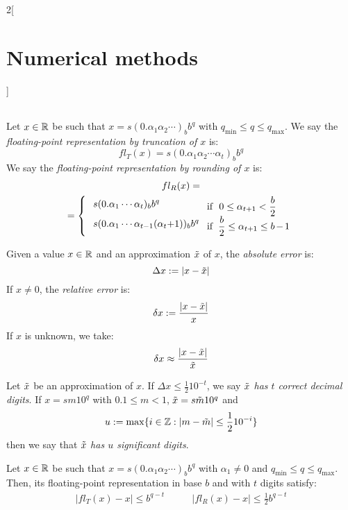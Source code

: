 \documentclass[../../../main.tex]{subfiles}
\begin{document}
\begin{multicols}{2}[\section{Numerical methods}]
\begin{center}
\begin{minipage}{\linewidth}
\begin{tabular}{c|ccccc}
      \end{tabular}
    \end{minipage}
  \end{center}
  \begin{definition}
    Let $x\in\mathbb{R}$ be such that $x=s(0.\alpha_1\alpha_2\cdots)_bb^q$ with $q_\text{min}\leq q\leq q_\text{max}$. We say the \textit{floating-point representation by truncation of $x$} is: $$fl_T(x)=s(0.\alpha_1\alpha_2\cdots\alpha_t)_bb^q$$ We say the \textit{floating-point representation by rounding of $x$} is:
    \begin{multline*}
      fl_R(x)=\\=\left\{\text{\setlength{\tabcolsep}{4pt}
        \begin{tabular}{m{3.85cm}m{3cm}}
          $s(0.\alpha_1\cdots\alpha_t)_bb^q$                 & if $\ 0\leq\alpha_{t+1}<\frac{b}{2}$       \\
          $s(0.\alpha_1\cdots\alpha_{t-1}(\alpha_t+1))_bb^q$ & if $\ \frac{b}{2}\leq\alpha_{t+1}\leq b-1$
        \end{tabular}}\right.
    \end{multline*}
  \end{definition}
  \begin{definition}
    Given a value $x\in\mathbb{R}$ and an approximation $\Tilde{x}$ of $x$, the \textit{absolute error} is: $$\Delta x:=|x-\Tilde{x}|$$ If $x\ne 0$, the \textit{relative error} is: $$\delta x:=\frac{|x-\Tilde{x}|}{x}$$ If $x$ is unknown, we take: $$\delta x\approx\frac{|x-\Tilde{x}|}{\Tilde{x}}$$
  \end{definition}
  \begin{definition}
    Let $\Tilde{x}$ be an approximation of $x$. If $\Delta x\leq\frac{1}{2}10^{-t}$, we say \textit{$\Tilde{x}$ has $t$ correct decimal digits}. If $x=sm10^q$ with $0.1\leq m<1$, $\Tilde{x}=s\Tilde{m}10^q$ and $$u:=\max\{i\in\mathbb{Z}:|m-\Tilde{m}|\leq\frac{1}{2}10^{-i}\}$$ then we say that $\Tilde{x}$ \textit{has $u$ significant digits}.
  \end{definition}
  \begin{prop}
    Let $x\in\mathbb{R}$ be such that $x=s(0.\alpha_1\alpha_2\cdots)_bb^q$ with $\alpha_1\ne0$ and $q_\text{min}\leq q\leq q_\text{max}$. Then, its floating-point representation in base $b$ and with $t$ digits satisfy:
    \begin{align*}
      \left|fl_T(x)-x\right|\leq b^{q-t}\quad           & \quad \left|fl_R(x)-x\right|\leq\frac{1}{2}b^{q-t}           \\

\end{align*}
\end{prop}
\end{multicols}
\end{document}
